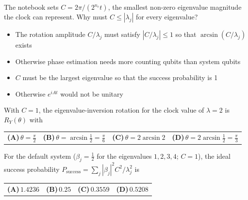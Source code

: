 \documentclass[11pt,a4paper]{article}
\newcommand{\optlabel}[1]{\textbf{(#1)}}
\newenvironment{qitem}[1]{\begin{list}{}{\setlength{\leftmargin}{3.3em}\setlength{\labelwidth}{3.1em}%
  \setlength{\labelsep}{0.2em}\setlength{\topsep}{3pt}\setlength{\parsep}{3pt}}\item[\textbf{Q.#1}\hfill]}{\end{list}}
\newcommand{\qsep}{\par\vspace{2pt}{\color{black!15}\hrule}\vspace{4pt}}
\begin{document}
\begin{qitem}{43}
The notebook sets $C = 2\pi/(2^{n_c}t)$, the smallest non-zero eigenvalue magnitude the clock can represent. Why must $C \le |\lambda_j|$ for every eigenvalue?
\begin{itemize}[leftmargin=2.6em, labelsep=0.4em, itemsep=2pt, topsep=3pt]
\item[\optlabel{A}] The rotation amplitude $C/\lambda_j$ must satisfy $|C/\lambda_j| \le 1$ so that $\arcsin(C/\lambda_j)$ exists
\item[\optlabel{B}] Otherwise phase estimation needs more counting qubits than system qubits
\item[\optlabel{C}] $C$ must be the largest eigenvalue so that the success probability is 1
\item[\optlabel{D}] Otherwise $e^{iAt}$ would not be unitary
\end{itemize}
\end{qitem}
\qsep

\begin{qitem}{44}
With $C = 1$, the eigenvalue-inversion rotation for the clock value of $\lambda = 2$ is $R_Y(\theta)$ with
\par\smallskip\noindent\begin{tabularx}{\linewidth}{@{}*{4}{L}@{}}
\optlabel{A}\,$\theta = \tfrac\pi2$ & \optlabel{B}\,$\theta = \arcsin\tfrac12 = \tfrac\pi6$ & \optlabel{C}\,$\theta = 2\arcsin2$ & \optlabel{D}\,$\theta = 2\arcsin\tfrac12 = \tfrac\pi3$
\end{tabularx}
\end{qitem}
\qsep

\begin{qitem}{45}
For the default system ($\beta_j = \tfrac12$ for the eigenvalues $1, 2, 3, 4$; $C = 1$), the ideal success probability $P_{\text{success}} = \sum_j|\beta_j|^2C^2/\lambda_j^2$ is
\par\smallskip\noindent\begin{tabularx}{\linewidth}{@{}*{4}{L}@{}}
\optlabel{A}\,$1.4236$ & \optlabel{B}\,$0.25$ & \optlabel{C}\,$0.3559$ & \optlabel{D}\,$0.5208$
\end{tabularx}
\end{qitem}
\qsep
\end{document}
